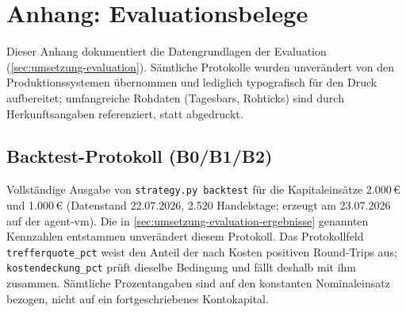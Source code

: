 %

\chapter{Anhang: Evaluationsbelege}
\label{sec:anhang-evaluationsbelege}


Dieser Anhang dokumentiert die Datengrundlagen der Evaluation
(\cref{sec:umsetzung-evaluation}). Sämtliche Protokolle wurden unverändert von
den Produktionssystemen übernommen und lediglich typografisch für den Druck
aufbereitet; umfangreiche Rohdaten (Tagesbars, Rohticks) sind durch
Herkunftsangaben referenziert, statt abgedruckt.

\section{Backtest-Protokoll (B0/B1/B2)}
\label{sec:anhang-backtest}

Vollständige Ausgabe von \texttt{strategy.py backtest} für die Kapitaleinsätze
2.000\,€ und 1.000\,€ (Datenstand 22.07.2026, 2.520 Handelstage; erzeugt am
23.07.2026 auf der agent-vm). Die in \cref{sec:umsetzung-evaluation-ergebnisse}
genannten Kennzahlen entstammen unverändert diesem Protokoll. Das Protokollfeld
\texttt{trefferquote\_pct} weist den Anteil der nach Kosten positiven Round-Trips
aus; \texttt{kostendeckung\_pct} prüft dieselbe Bedingung und fällt deshalb mit ihm
zusammen. Sämtliche Prozentangaben sind auf den konstanten Nominaleinsatz bezogen,
nicht auf ein fortgeschriebenes Kontokapital.



